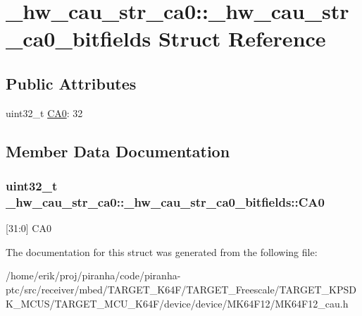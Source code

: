 \hypertarget{struct__hw__cau__str__ca0_1_1__hw__cau__str__ca0__bitfields}{}\section{\+\_\+hw\+\_\+cau\+\_\+str\+\_\+ca0\+:\+:\+\_\+hw\+\_\+cau\+\_\+str\+\_\+ca0\+\_\+bitfields Struct Reference}
\label{struct__hw__cau__str__ca0_1_1__hw__cau__str__ca0__bitfields}
\subsection*{Public Attributes}
\begin{DoxyCompactItemize}
\item 
uint32\+\_\+t \hyperlink{struct__hw__cau__str__ca0_1_1__hw__cau__str__ca0__bitfields_aceea8637cd3d73cd48e7636e592e60fa}{C\+A0}\+: 32
\end{DoxyCompactItemize}


\subsection{Member Data Documentation}
\subsubsection[{\texorpdfstring{C\+A0}{CA0}}]{\setlength{\rightskip}{0pt plus 5cm}uint32\+\_\+t \+\_\+hw\+\_\+cau\+\_\+str\+\_\+ca0\+::\+\_\+hw\+\_\+cau\+\_\+str\+\_\+ca0\+\_\+bitfields\+::\+C\+A0}\hypertarget{struct__hw__cau__str__ca0_1_1__hw__cau__str__ca0__bitfields_aceea8637cd3d73cd48e7636e592e60fa}{}\label{struct__hw__cau__str__ca0_1_1__hw__cau__str__ca0__bitfields_aceea8637cd3d73cd48e7636e592e60fa}
\mbox{[}31\+:0\mbox{]} C\+A0 

The documentation for this struct was generated from the following file\+:\begin{DoxyCompactItemize}
\item 
/home/erik/proj/piranha/code/piranha-\/ptc/src/receiver/mbed/\+T\+A\+R\+G\+E\+T\+\_\+\+K64\+F/\+T\+A\+R\+G\+E\+T\+\_\+\+Freescale/\+T\+A\+R\+G\+E\+T\+\_\+\+K\+P\+S\+D\+K\+\_\+\+M\+C\+U\+S/\+T\+A\+R\+G\+E\+T\+\_\+\+M\+C\+U\+\_\+\+K64\+F/device/device/\+M\+K64\+F12/M\+K64\+F12\+\_\+cau.\+h\end{DoxyCompactItemize}

